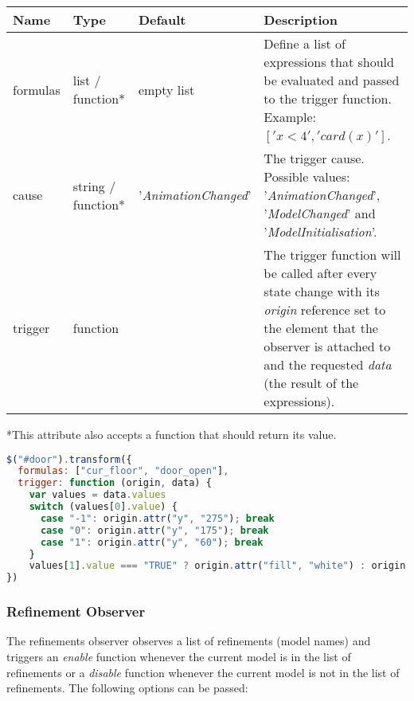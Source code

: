 \begin{tabular}{ l l l p{7cm} }
  \textbf{Name} & \textbf{Type} & \textbf{Default} & \textbf{Description} \\
  \hline\noalign{\medskip}
  formulas & list / function* & empty list & Define a list of expressions that should be evaluated and passed to the trigger function. Example: $['x < 4', 'card(x)']$.\\
  \hline\noalign{\medskip}
  cause & string / function* & '\textit{AnimationChanged}' & The trigger cause. Possible values: '\textit{AnimationChanged}', '\textit{ModelChanged}' and '\textit{ModelInitialisation}'. \\
  \hline\noalign{\medskip}
  trigger & function &  & The trigger function will be called after every state change with its \textit{origin} reference set to the element that the observer is attached to and the requested \textit{data} (the result of the expressions). \\
\end{tabular}

*This attribute also accepts a function that should return its value.

\begin{lstlisting}[float=ht,language=JavaScript]
$("#door").transform({
  formulas: ["cur_floor", "door_open"],
  trigger: function (origin, data) {
    var values = data.values
    switch (values[0].value) {
      case "-1": origin.attr("y", "275"); break
      case "0": origin.attr("y", "175"); break
      case "1": origin.attr("y", "60"); break
    }
    values[1].value === "TRUE" ? origin.attr("fill", "white") : origin.attr("fill", "lightgray")
})
\end{lstlisting}

\subsubsection{Refinement Observer}

The refinements observer observes a list of refinements (model names) and triggers an \textit{enable} function whenever the current model is in the list of refinements or a \textit{disable} function whenever the current model is not in the list of refinements.
The following options can be passed:


